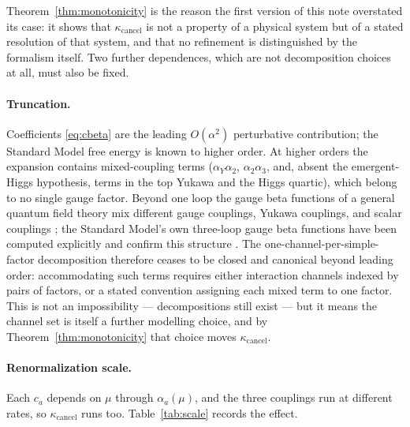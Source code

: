 \documentclass[11pt]{article}
\theoremstyle{definition}
\theoremstyle{remark}
\newcommand{\kcancel}{\kappa_{\mathrm{cancel}}}
\begin{document}
Theorem~\ref{thm:monotonicity} is the reason the first version of this note overstated its case: it
shows that $\kcancel$ is not a property of a physical system but of a stated resolution of that
system, and that no refinement is distinguished by the formalism itself. Two further dependences,
which are not decomposition choices at all, must also be fixed.

\paragraph{Truncation.} Coefficients \eqref{eq:cbeta} are the leading $O(\alpha^2)$ perturbative
contribution; the Standard Model free energy is known to higher order. At higher orders the
expansion contains mixed-coupling terms ($\alpha_Y\alpha_2$, $\alpha_2\alpha_3$, and, absent the
emergent-Higgs hypothesis, terms in the top Yukawa and the Higgs quartic), which belong to no
single gauge factor. Beyond one loop the gauge beta functions of a general quantum field theory mix
different gauge couplings, Yukawa couplings, and scalar couplings \citep{MachacekVaughn1983}; the
Standard Model's own three-loop gauge beta functions have been computed explicitly and confirm this
structure \citep{Mihaila2012}. The one-channel-per-simple-factor decomposition therefore ceases to
be closed and canonical beyond leading order: accommodating such terms requires either interaction
channels indexed by pairs of factors, or a stated convention assigning each mixed term to one
factor. This is not an impossibility --- decompositions still exist --- but it means the channel set
is itself a further modelling choice, and by Theorem~\ref{thm:monotonicity} that choice moves
$\kcancel$.

\paragraph{Renormalization scale.} Each $c_a$ depends on $\mu$ through $\alpha_a(\mu)$, and the
three couplings run at different rates, so $\kcancel$ runs too. Table~\ref{tab:scale} records the
effect.
\end{document}
